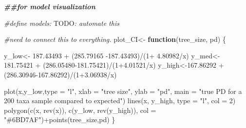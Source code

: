 \documentclass[
]{article}
\newenvironment{Shaded}{\begin{snugshade}}{\end{snugshade}}
\newcommand{\AlertTok}[1]{\textcolor[rgb]{0.94,0.16,0.16}{#1}}
\newcommand{\AttributeTok}[1]{\textcolor[rgb]{0.77,0.63,0.00}{#1}}
\newcommand{\CommentTok}[1]{\textcolor[rgb]{0.56,0.35,0.01}{\textit{#1}}}
\newcommand{\ControlFlowTok}[1]{\textcolor[rgb]{0.13,0.29,0.53}{\textbf{#1}}}
\newcommand{\DecValTok}[1]{\textcolor[rgb]{0.00,0.00,0.81}{#1}}
\newcommand{\DocumentationTok}[1]{\textcolor[rgb]{0.56,0.35,0.01}{\textbf{\textit{#1}}}}
\newcommand{\FloatTok}[1]{\textcolor[rgb]{0.00,0.00,0.81}{#1}}
\newcommand{\FunctionTok}[1]{\textcolor[rgb]{0.00,0.00,0.00}{#1}}
\newcommand{\NormalTok}[1]{#1}
\newcommand{\OtherTok}[1]{\textcolor[rgb]{0.56,0.35,0.01}{#1}}
\newcommand{\SpecialCharTok}[1]{\textcolor[rgb]{0.00,0.00,0.00}{#1}}
\newcommand{\StringTok}[1]{\textcolor[rgb]{0.31,0.60,0.02}{#1}}
\begin{document}
\begin{Shaded}
\begin{Highlighting}[]
\DocumentationTok{\#\#for model visualization}

\CommentTok{\#define models: }\AlertTok{TODO}\CommentTok{: automate this}

\CommentTok{\#need to connect this to everything. }
\NormalTok{plot\_CI}\OtherTok{\textless{}{-}} \ControlFlowTok{function}\NormalTok{(tree\_size, pd)}
\NormalTok{\{}
  
\NormalTok{  y\_low}\OtherTok{\textless{}{-}} \FloatTok{187.43493} \SpecialCharTok{+}\NormalTok{ (}\FloatTok{285.79165} \SpecialCharTok{{-}}\FloatTok{187.43493}\NormalTok{)}\SpecialCharTok{/}\NormalTok{(}\DecValTok{1}\SpecialCharTok{+} \FloatTok{4.80982}\SpecialCharTok{/}\NormalTok{x)}
\NormalTok{  y\_med}\OtherTok{\textless{}{-}} \FloatTok{181.75421} \SpecialCharTok{+}\NormalTok{ (}\FloatTok{286.05480{-}181.75421}\NormalTok{)}\SpecialCharTok{/}\NormalTok{(}\DecValTok{1}\FloatTok{+4.01521}\SpecialCharTok{/}\NormalTok{x)}
\NormalTok{  y\_high}\OtherTok{\textless{}{-}}\FloatTok{167.86292} \SpecialCharTok{+}\NormalTok{ (}\FloatTok{286.30946{-}167.86292}\NormalTok{)}\SpecialCharTok{/}\NormalTok{(}\DecValTok{1}\FloatTok{+3.06938}\SpecialCharTok{/}\NormalTok{x)}
  
  \FunctionTok{plot}\NormalTok{(x,y\_low,}\AttributeTok{type =} \StringTok{"l"}\NormalTok{, }\AttributeTok{xlab =} \StringTok{"tree size"}\NormalTok{, }\AttributeTok{ylab =} \StringTok{"pd"}\NormalTok{, }\AttributeTok{main =} \StringTok{"true PD for a 200 taxa sample compared to expected"}\NormalTok{)}
  \FunctionTok{lines}\NormalTok{(x, y\_high, }\AttributeTok{type =} \StringTok{"l"}\NormalTok{, }\AttributeTok{col =} \DecValTok{2}\NormalTok{)}
  \FunctionTok{polygon}\NormalTok{(}\FunctionTok{c}\NormalTok{(x, }\FunctionTok{rev}\NormalTok{(x)), }\FunctionTok{c}\NormalTok{(y\_low, }\FunctionTok{rev}\NormalTok{(y\_high)),}
        \AttributeTok{col =} \StringTok{"\#6BD7AF"}\NormalTok{)}\SpecialCharTok{+}\FunctionTok{points}\NormalTok{(tree\_size,pd)}
\NormalTok{\}}
\end{Highlighting}
\end{Shaded}
\end{document}
